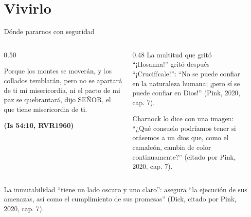 \documentclass[hyperref={bookmarks=false},aspectratio=169]{beamer}
\newcommand{\SENOR}{S{\fontsize{0.78em}{1em}\selectfont EÑOR}}
\newcommand{\fuente}[1]{\par\hfill{\upshape\bfseries\footnotesize\textcolor{azul}{#1}}}
\begin{document}
\section{Vivirlo}

\begin{frame}{Dónde pararnos con seguridad}
\begin{columns}[t,onlytextwidth]
\begin{column}{0.50\textwidth}
\begin{cita}Porque los montes se moverán, y los collados temblarán, pero no se apartará de ti mi misericordia, ni el pacto de mi paz se quebrantará, dijo \SENOR, el que tiene misericordia de ti.\fuente{(Is 54:10, RVR1960)}\end{cita}
\end{column}
\begin{column}{0.48\textwidth}\small
La multitud que gritó ``¡Hosanna!'' gritó después ``¡Crucifícale!'': ``No se puede confiar en la naturaleza humana; ¡pero sí se puede confiar en Dios!'' (Pink, 2020, cap. 7).\par\medskip
Charnock lo dice con una imagen: ``¿Qué consuelo podríamos tener si orásemos a un dios que, como el camaleón, cambia de color continuamente?'' (citado por Pink, 2020, cap. 7).
\end{column}
\end{columns}\par\smallskip
\begin{tcolorbox}[colback=papiro,colframe=dorado,boxrule=1.2pt,arc=3pt]
\small La inmutabilidad ``tiene un lado oscuro y uno claro'': asegura ``la ejecución de sus amenazas, así como el cumplimiento de sus promesas'' (Dick, citado por Pink, 2020, cap. 7).
\end{tcolorbox}
\end{frame}
\end{document}
